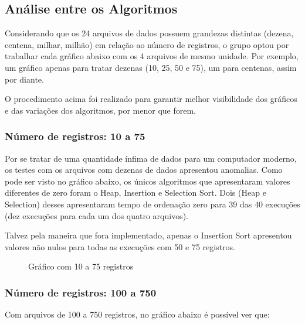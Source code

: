 \documentclass[a4paper,12pt]{scrartcl}
\begin{document}
\subsection{Análise entre os Algoritmos}
Considerando que os 24 arquivos de dados possuem grandezas distintas (dezena, centena, milhar, milhão) em relação ao número de registros, o grupo optou por trabalhar cada gráfico abaixo com os 4 arquivos de mesmo unidade. Por exemplo, um gráfico apenas para tratar dezenas (10, 25, 50 e 75), um para centenas, assim por diante.

O procedimento acima foi realizado para garantir melhor visibilidade dos gráficos e das variações dos algoritmos, por menor que forem.

\subsubsection{Número de registros: 10 a 75}

Por se tratar de uma quantidade ínfima de dados para um computador moderno, os testes com os arquivos com dezenas de dados apresentou anomalias. Como pode ser visto no gráfico abaixo, os únicos algoritmos que apresentaram valores diferentes de zero foram o Heap, Insertion e Selection Sort. Dois (Heap e Selection) desses apresentaram tempo de ordenação zero para 39 das 40 execuções (dez execuções para cada um dos quatro arquivos).

Talvez pela maneira que fora implementado, apenas o Insertion Sort apresentou valores não nulos para todas as execuções com 50 e 75 registros.

\begin{figure}[H]
    \centering
    
    \caption{Gráfico com 10 a 75 registros}
    \label{mapaSelect}
\end{figure}

\subsubsection{Número de registros: 100 a 750}

Com arquivos de 100 a 750 registros, no gráfico abaixo é possível ver que:
\end{document}
